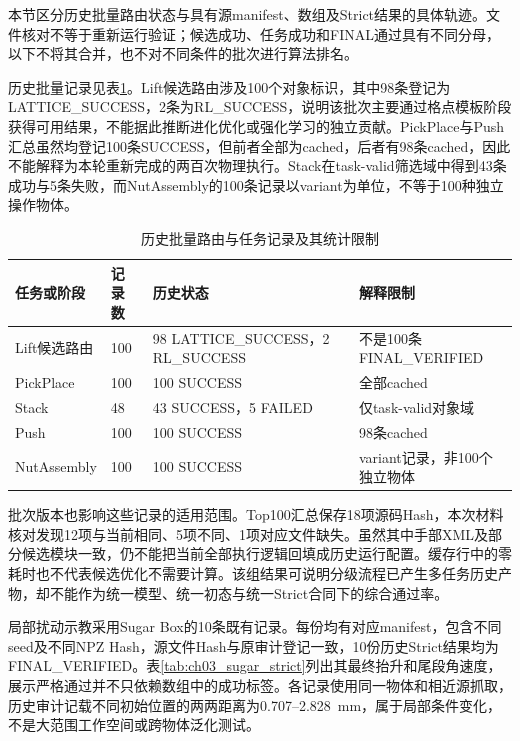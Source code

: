 本节区分历史批量路由状态与具有源manifest、数组及Strict结果的具体轨迹。文件核对不等于重新运行验证；候选成功、任务成功和FINAL通过具有不同分母，以下不将其合并，也不对不同条件的批次进行算法排名。

历史批量记录见表\ref{tab:ch03_historical_batches}。Lift候选路由涉及100个对象标识，其中98条登记为LATTICE\_SUCCESS，2条为RL\_SUCCESS，说明该批次主要通过格点模板阶段获得可用结果，不能据此推断进化优化或强化学习的独立贡献。PickPlace与Push汇总虽然均登记100条SUCCESS，但前者全部为cached，后者有98条cached，因此不能解释为本轮重新完成的两百次物理执行。Stack在task-valid筛选域中得到43条成功与5条失败，而NutAssembly的100条记录以variant为单位，不等于100种独立操作物体。

\begin{table}[htbp]
 \centering\small
 \caption{历史批量路由与任务记录及其统计限制}
 \label{tab:ch03_historical_batches}
 \begin{tabular}{p{}p{}p{}p{}}
 \hline
 任务或阶段 & 记录数 & 历史状态 & 解释限制\\
 \hline
 Lift候选路由 & 100 & 98 LATTICE\_SUCCESS，2 RL\_SUCCESS & 不是100条FINAL\_VERIFIED\\
 PickPlace & 100 & 100 SUCCESS & 全部cached\\
 Stack & 48 & 43 SUCCESS，5 FAILED & 仅task-valid对象域\\
 Push & 100 & 100 SUCCESS & 98条cached\\
 NutAssembly & 100 & 100 SUCCESS & variant记录，非100个独立物体\\
 \hline
 \end{tabular}
\end{table}

批次版本也影响这些记录的适用范围。Top100汇总保存18项源码Hash，本次材料核对发现12项与当前相同、5项不同、1项对应文件缺失。虽然其中手部XML及部分候选模块一致，仍不能把当前全部执行逻辑回填成历史运行配置。缓存行中的零耗时也不代表候选优化不需要计算。该组结果可说明分级流程已产生多任务历史产物，却不能作为统一模型、统一初态与统一Strict合同下的综合通过率。

局部扰动示教采用Sugar Box的10条既有记录。每份均有对应manifest，包含不同seed及不同NPZ Hash，源文件Hash与原审计登记一致，10份历史Strict结果均为FINAL\_VERIFIED。表\ref{tab:ch03_sugar_strict}列出其最终抬升和尾段角速度，展示严格通过并不只依赖数组中的成功标签。各记录使用同一物体和相近源抓取，历史审计记载不同初始位置的两两距离为0.707--2.828~mm，属于局部条件变化，不是大范围工作空间或跨物体泛化测试。

